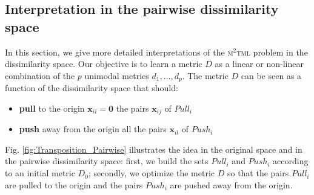 \subsection{Interpretation in the pairwise dissimilarity space}
In this section, we give more detailed interpretations of the \textsc{m$^2$tml} problem in the dissimilarity space. Our objective is to learn a metric $D$ as a linear or non-linear combination of the $p$ unimodal metrics $d_1, \ldots, d_p$. The metric $D$ can be seen as a function of the dissimilarity space that should:
\begin{itemize}
	\item \textbf{pull} to the origin $\textbf{x}_{ii} = \textbf{0}$ the pairs $\textbf{x}_{ij}$ of $Pull_i$
	\item \textbf{push} away from the origin all the pairs $\textbf{x}_{il}$ of $Push_i$
\end{itemize}
Fig. \ref{fig:Transposition_Pairwise} illustrates the idea in the original space and in the pairwise dissimilarity space: first, we build the sets $Pull_i$ and $Push_i$ according to an initial metric $D_0$; secondly, we optimize the metric $D$ so that the pairs $Pull_i$ are pulled to the origin and the pairs $Push_i$ are pushed away from the origin.

